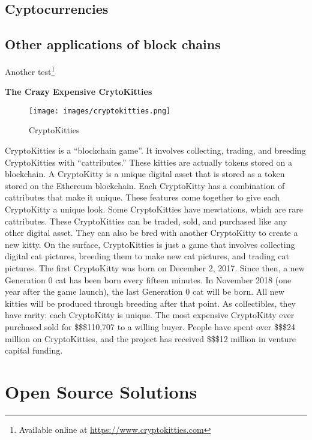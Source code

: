 \documentclass[]{book}
\let\rmarkdownfootnote\footnote%
\def\footnote{\protect\rmarkdownfootnote}
\let\BeginKnitrBlock\begin \let\EndKnitrBlock\end
\begin{document}
\hypertarget{cyptocurrencies}{%
\subsection{Cyptocurrencies}\label{cyptocurrencies}}

\hypertarget{other-applications-of-block-chains}{%
\subsection{Other applications of block chains}\label{other-applications-of-block-chains}}

Another test\footnote{Available online at \url{https://www.cryptokitties.com}}

\BeginKnitrBlock{rmdstudy}
\textbf{The Crazy Expensive CrytoKitties}

\begin{figure}
\centering
\texttt{[image: images/cryptokitties.png]}
\caption{CryptoKitties}
\end{figure}

CryptoKitties is a ``blockchain game''. It involves collecting, trading, and breeding CryptoKitties with ``cattributes.'' These kitties are actually tokens stored on a blockchain. A CryptoKitty is a unique digital asset that is stored as a token stored on the Ethereum blockchain.\citep{TCT2018} Each CryptoKitty has a combination of cattributes that make it unique. These features come together to give each CryptoKitty a unique look. Some CryptoKitties have mewtations, which are rare cattributes. These CryptoKitties can be traded, sold, and purchased like any other digital asset. They can also be bred with another CryptoKitty to create a new kitty. On the surface, CryptoKitties is just a game that involves collecting digital cat pictures, breeding them to make new cat pictures, and trading cat pictures. The first CryptoKitty was born on December 2, 2017. Since then, a new Generation 0 cat has been born every fifteen minutes. In November 2018 (one year after the game launch), the last Generation 0 cat will be born. All new kitties will be produced through breeding after that point. As collectibles, they have rarity: each CryptoKitty is unique. The most expensive CryptoKitty ever purchased sold for \$\$\$110,707 to a willing buyer. People have spent over \$\$\$24 million on CryptoKitties, and the project has received \$\$\$12 million in venture capital funding.\citep{Hoffman2018}
\EndKnitrBlock{rmdstudy}

\hypertarget{open-source-solutions}{%
\section{Open Source Solutions}\label{open-source-solutions}}
\end{document}
